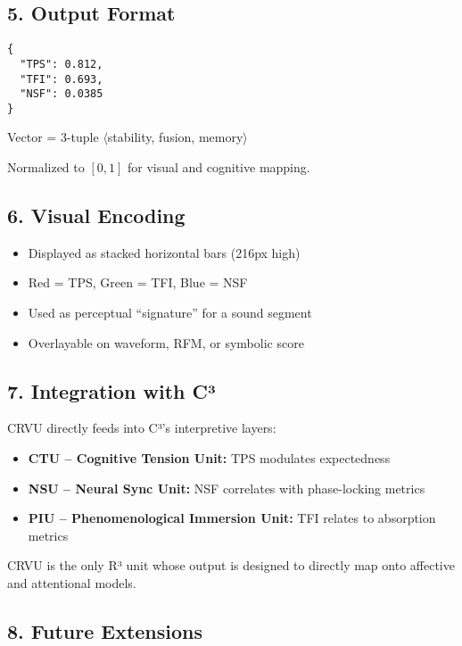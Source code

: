 \subsection*{5. Output Format}

\begin{verbatim}
{
  "TPS": 0.812,
  "TFI": 0.693,
  "NSF": 0.0385
}
\end{verbatim}

Vector = 3-tuple $\langle$stability, fusion, memory$\rangle$

Normalized to $[0, 1]$ for visual and cognitive mapping.

\subsection*{6. Visual Encoding}

\begin{itemize}
    \item Displayed as stacked horizontal bars (216px high)
    \item Red = TPS, Green = TFI, Blue = NSF
    \item Used as perceptual “signature” for a sound segment
    \item Overlayable on waveform, RFM, or symbolic score
\end{itemize}

\subsection*{7. Integration with C³}

CRVU directly feeds into C³'s interpretive layers:

\begin{itemize}
    \item \textbf{CTU – Cognitive Tension Unit:} TPS modulates expectedness
    \item \textbf{NSU – Neural Sync Unit:} NSF correlates with phase-locking metrics
    \item \textbf{PIU – Phenomenological Immersion Unit:} TFI relates to absorption metrics
\end{itemize}

CRVU is the only R³ unit whose output is designed to directly map onto affective and attentional models.

\subsection*{8. Future Extensions}

